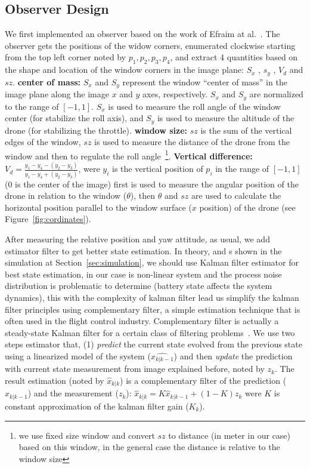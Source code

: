 \documentclass{sig-alternate-ipsn13}
\begin{document}
\subsection{Observer Design}
\label{sec:Observer Design}
We first implemented an observer based on the work of Efraim at al.~\cite{?? Dynamic Image Based Visual Servo Control of Micro Aerial Vehicles Relative to a Window}. The observer gets the positions of the widow corners, enumerated clockwise starting from the top left corner noted by $p_1,p_2,p_3,p_4$, and extract 4 quantities based on the shape and location of the window corners in the image plane: $S_x$ , $s_y$ , $V_d$ and $sz$.
\textbf{center of mass:} $S_x$ and $S_y$ represent the window ``center of mass'' in the image plane along the image $x$ and $y$ axes, respectively. $S_x$ and $S_y$ are normalized to the range of $[-1,1]$.
$S_x$ is used to measure the roll angle of the window center (for stabilize the roll axis), and $S_y$ is used to measure the altitude of the drone (for stabilizing the throttle).
\textbf{window size:} $sz$ is the sum of the vertical edges of the window, $sz$ is used to measure the distance of the drone from the window and then to regulate the roll angle~\footnote{we use fixed size window and convert $sz$ to distance (in meter in our case) based on this window, in the general case the distance is relative to the window size}.
\textbf{Vertical difference:} $V_d = \frac{y_1-y_4-(y_2-y_3)}{y_1-y_4+(y_2-y_3)}$, were $y_i$ is the vertical position of $p_i$ in the range of $[-1,1]$ (0 is the center of the image) first is used to measure the angular position of the drone in relation to the window ($\theta$), then $\theta$ and $sz$ are used to calculate the horizontal position parallel to the window surface ($x$ position) of the drone (see Figure~\ref{fig:cordinates}). 

After measuring the relative position and yaw attitude, as usual, we add estimator filter to get better state estimation. 
In theory, and s shown in the simulation at Section~\ref{sec:simulation}, we should use Kalman filter estimator for best state estimation, in our case is non-linear system and the process noise distribution is problematic to determine (battery state affects the system dynamics), this with the complexity of kalman filter lead us simplify the kalman filter principles using complementary filter, a simple estimation technique that is often used in the flight control industry.
Complementary filter is actually a steady-state Kalman filter for a certain class of filtering problems~\cite{complementaryVSKalman}.
We use two steps estimator that, (1) \textit{predict} the current state evolved from the previous state using a linearized model of the system ($\hat{x_{k|k-1}}$) and then \textit{update} the prediction with current state measurement from image explained before, noted by $z_k$.
The result estimation (noted by $\hat{x}_{k|k}$) is a complementary filter of the prediction ($\hat{x}_{k|k-1}$) and the measurement ($z_k$):
$ \hat{x}_{k|k} = K \hat{x}_{k|k-1} + (1-K) z_k $ were $K$ is constant approximation of the kalman filter gain ($K_k$).
\end{document}
